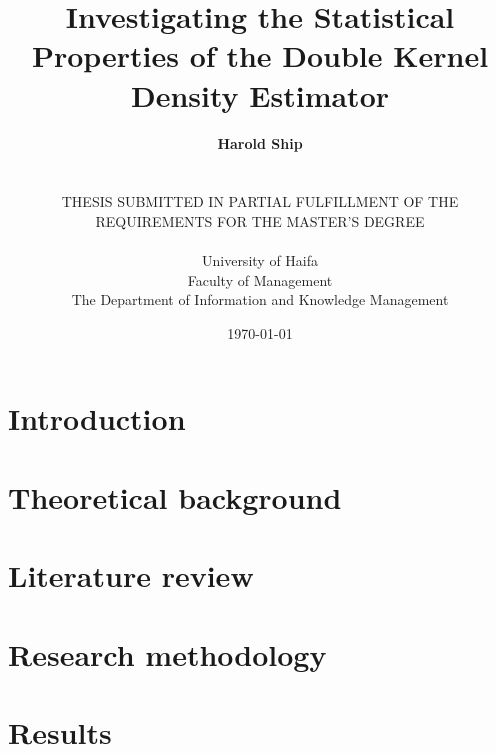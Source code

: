 \documentclass[a4paper,12pt,titlepage,twoside,openany]{book}
\title{
    \textbf{Investigating the Statistical Properties of the Double Kernel Density Estimator}
}
\author{
    \textbf{Harold Ship}\\%
    \\%
    \\%
    THESIS SUBMITTED IN PARTIAL FULFILLMENT OF THE\\%
    REQUIREMENTS FOR THE MASTER'S DEGREE\\%
    \\%
    University of Haifa\\%
    Faculty of Management\\%
    The Department of Information and Knowledge Management
}
\date{\printdayoff\today}
\begin{document}
\lstset{language=R}

\frontmatter                            %
\doublespacing
\maketitle                              %

\cleardoublepage


\cleardoublepage

%

\singlespacing                          %
\tableofcontents                        %
\cleardoublepage


\cleardoublepage

\listoftables
\cleardoublepage
\listoffigures
\printglossaries


\mainmatter                             %

\onehalfspacing
\chapter{Introduction}
\label{ch:introduction}


\chapter{Theoretical background}
\label{ch:theory}


\chapter{Literature review}
\label{ch:literature}


\chapter{Research methodology}
\label{ch:method}


\chapter{Results}
\label{ch:results}

\end{document}

